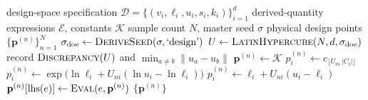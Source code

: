 \begin{algorithm}[!t]
\caption{Configuration-driven DRAM design-space sampling}
\label{alg:configuration_driven_dram_design_space_sampling}
\begin{algorithmic}[1]
\Require design-space specification $\mathcal{D}=\{(v_i,\ell_i,u_i,s_i,k_i)\}_{i=1}^{d}$
\Require derived-quantity expressions $\mathcal{E}$, constants $\mathcal{K}$
\Require sample count $N$, master seed $\sigma$
\Ensure physical design points $\{\mathbf{p}^{(n)}\}_{n=1}^{N}$
    \State $\sigma_{\text{doe}} \leftarrow \textsc{DeriveSeed}(\sigma, \text{`design'})$
    \State $U \leftarrow \textsc{LatinHypercube}(N, d, \sigma_{\text{doe}})$
    \State record $\textsc{Discrepancy}(U)$ and $\min_{a\neq b}\lVert u_a-u_b\rVert$
        \State $\mathbf{p}^{(n)} \leftarrow \mathcal{K}$
                \State $p^{(n)}_i \leftarrow c_{\lfloor U_{ni}\,|C_i| \rfloor}$
                \State $p^{(n)}_i \leftarrow \exp\!\big(\ln \ell_i + U_{ni}(\ln u_i - \ln \ell_i)\big)$
            \Else
                \State $p^{(n)}_i \leftarrow \ell_i + U_{ni}(u_i-\ell_i)$
            \EndIf
        \EndFor
            \State $\mathbf{p}^{(n)}[\text{lhs}(e)] \leftarrow \textsc{Eval}(e, \mathbf{p}^{(n)})$
        \EndFor
    \EndFor
    \Return $\{\mathbf{p}^{(n)}\}$
\end{algorithmic}
\end{algorithm}
